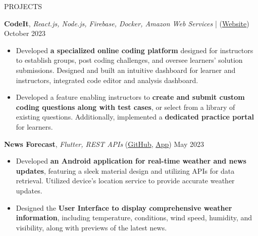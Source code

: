 \documentclass{resume} %
\begin{document}
\begin{rSection}{PROJECTS}
    \vspace{-1.25em}

    \item \textbf{CodeIt}, \textit{React.js, Node.js, Firebase, Docker, Amazon Web Services} | (\href{https://codeitonline.xyz/}{Website}) \hfill {October 2023}
    \begin{itemize}
        \setlength\itemsep{-0.6em}
        \item Developed \textbf{a specialized online coding platform} designed for instructors to establish groups, post coding challenges, and oversee learners' solution submissions. Designed and built an intuitive dashboard for learner and instructors, integrated code editor and analysis dashboard.
        \item Developed a feature enabling instructors to \textbf{create and submit custom coding questions along with test cases}, or select from a library of existing questions. Additionally, implemented a \textbf{dedicated practice portal} for learners.
    \end{itemize}

    \item \textbf{News Forecast}, \textit{Flutter, REST APIs} (\href{https://github.com/ninadnaik10/news-forecast}{GitHub}, \href{https://github.com/ninadnaik10/News-Forecast/releases}{App}) \hfill {May 2023}
    \begin{itemize}
        \setlength\itemsep{-0.6em}
        \item Developed \textbf{an Android application for real-time weather and news updates}, featuring a sleek material design and utilizing APIs for data retrieval. Utilized device's location service to provide accurate weather updates.
        \item Designed the \textbf{User Interface to display comprehensive weather information}, including temperature, conditions, wind speed, humidity, and visibility, along with previews of the latest news.
    \end{itemize}


\end{rSection}
\end{document}

